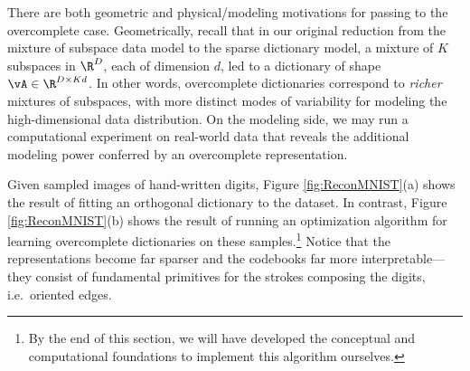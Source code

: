 \documentclass[../../book-main.tex]{subfiles}
\begin{document}
There are both geometric and physical/modeling motivations for passing to the overcomplete case. 
Geometrically, recall that in our original reduction from the mixture of subspace data model to the sparse dictionary model, a mixture of $K$ subspaces in $\R^D$, each of dimension $d$, led to a dictionary of shape $\vA \in \R^{D \times Kd}$.
In other words, overcomplete dictionaries correspond to \textit{richer} mixtures of subspaces, with more distinct modes of variability for modeling the high-dimensional data distribution.
On the modeling side, we may run a computational experiment on real-world data that reveals the additional modeling power conferred by an overcomplete representation.
\begin{example}
Given sampled images of hand-written digits, Figure \ref{fig:ReconMNIST}(a) shows the result of fitting an orthogonal dictionary to the dataset. 
In contrast, Figure \ref{fig:ReconMNIST}(b) shows the result of running an
    optimization algorithm for learning overcomplete dictionaries on these samples.\footnote{By the end of this section, we will have developed the conceptual and computational foundations to implement this algorithm ourselves.} 
Notice that the representations become far sparser and the codebooks far more interpretable---they consist of fundamental primitives for the strokes composing the digits, i.e.\ oriented edges.
\end{example}
\end{document}
